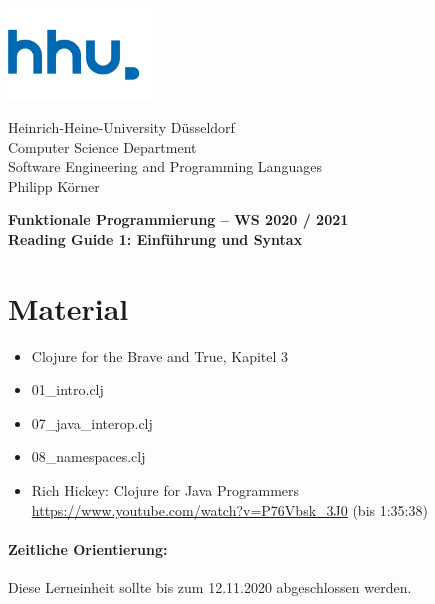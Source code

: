 \documentclass[11pt,a4paper]{article}
\begin{document}
\begin{minipage}[b]{\textwidth}
	\parbox[t]{5cm}{%
		\includegraphics[width=4cm]{unilogo}
		\hfill
	}
	\parbox[b]{11cm}{%
		Heinrich-Heine-University D\"usseldorf\\
		Computer Science Department\\
		Software Engineering and Programming Languages\\
		Philipp K\"orner
	}
\end{minipage}
\begin{center}
\bf
Funktionale Programmierung -- WS 2020 / 2021\\
Reading Guide 1: Einf\"uhrung und Syntax
\end{center}

\pagestyle{empty}


\section{Material} 

\begin{itemize}
\item Clojure for the Brave and True, Kapitel 3
\item 01\_intro.clj
\item 07\_java\_interop.clj
\item 08\_namespaces.clj
\item Rich Hickey: Clojure for Java Programmers \url{https://www.youtube.com/watch?v=P76Vbsk_3J0} (bis 1:35:38)
\end{itemize}

\paragraph{Zeitliche Orientierung:} Diese Lerneinheit sollte bis zum 12.11.2020 abgeschlossen werden.
\end{document}
